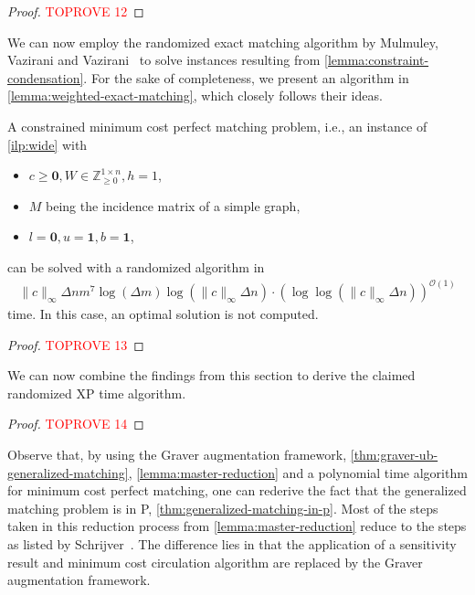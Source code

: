 \documentclass[a4paper,UKenglish,cleveref,thm-restate]{lipics-v2021}
\newcommand{\Z}{\mathbb Z}
\newcommand{\veczero}{\mathbf0}
\newcommand{\vecone}{\mathbf1}
\renewcommand{\O}{\mathcal O}
\begin{document}
\begin{proof}\textcolor{red}{TOPROVE 12}\end{proof}

We can now employ the randomized exact matching algorithm by Mulmuley, Vazirani and Vazirani~\cite{DBLP:journals/combinatorica/MulmuleyVV87} to solve instances resulting from \cref{lemma:constraint-condensation}. For the sake of completeness, we present an algorithm in \cref{lemma:weighted-exact-matching}, which closely follows their ideas.

\begin{lemma}
    A constrained minimum cost perfect matching problem, i.e., an instance of \cref{ilp:wide} with
    \begin{itemize}
        \item $c\ge\veczero,W\in\Z_{\ge0}^{1\times n},h=1$,
        \item $M$ being the incidence matrix of a simple graph,
        \item $l=\veczero,u=\vecone,b=\vecone$,
    \end{itemize}
    can be solved with a randomized algorithm in 
    \begin{align*}
        \|c\|_\infty\Delta nm^7\log(\Delta m)\log(\|c\|_\infty\Delta n)\cdot(\log\log(\|c\|_\infty\Delta n))^{\O(1)}
    \end{align*}
    time. In this case, an optimal solution is not computed.
    \label{lemma:weighted-exact-matching}
\end{lemma}

\begin{proof}\textcolor{red}{TOPROVE 13}\end{proof}

We can now combine the findings from this section to derive the claimed randomized XP time algorithm.

\begin{proof}\textcolor{red}{TOPROVE 14}\end{proof}

Observe that, by using the Graver augmentation framework, \cref{thm:graver-ub-generalized-matching}, \cref{lemma:master-reduction} and a polynomial time algorithm for minimum cost perfect matching, one can rederive the fact that the generalized matching problem is in P, \cref{thm:generalized-matching-in-p}. Most of the steps taken in this reduction process from \cref{lemma:master-reduction} reduce to the steps as listed by Schrijver~\cite{schrijver2003combinatorial}. The difference lies in that the application of a sensitivity result and minimum cost circulation algorithm are replaced by the Graver augmentation framework.
\end{document}
